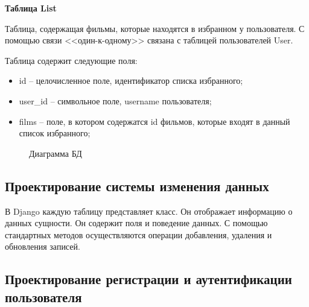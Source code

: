 \documentclass[a4paper, 14pt]{article}
\begin{document}
	\hfill \break
	
	{\bf Таблица List}
	
	Таблица, содержащая фильмы, которые находятся в избранном у пользователя. С помощью связи <<один-к-одному>> связана с таблицей пользователей User.
	
	Таблица содержит следующие поля:
	\begin{itemize}
		\item id – целочисленное поле, идентификатор списка избранного;
		\item user\_id – символьное поле, username пользователя;
		\item films – поле, в котором содержатся id фильмов, которые входят в данный список избранного;
	\end{itemize}

	\begin{figure}[h!]
	\caption{Диаграмма БД}
	\label{image0}
	\end{figure}

	\subsection{Проектирование системы изменения данных}%
	\setcounter{subsection}{2}
	
	В Django каждую таблицу представляет класс. Он отображает информацию о данных сущности. Он содержит поля и поведение данных. 
	С помощью стандартных методов осуществляются операции добавления, удаления и обновления записей.
	
	\subsection{Проектирование регистрации и аутентификации пользователя}%
	\setcounter{subsection}{3}
	
\end{document}
